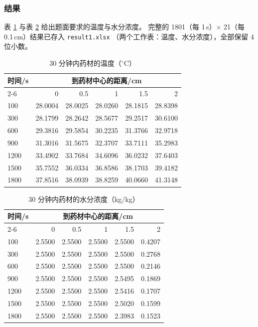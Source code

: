 \documentclass[withoutpreface,bwprint]{cumcmthesis}
\begin{document}
\subsubsection{结果}
表 \ref{tab:p1T} 与表 \ref{tab:p1C} 给出题面要求的温度与水分浓度。
完整的 1801（每 1\,s）$\times$ 21（每 0.1\,cm）结果已存入 \texttt{result1.xlsx}
（两个工作表：温度、水分浓度），全部保留 4 位小数。

\begin{table}[htbp]
  \centering
  \caption{30 分钟内药材的温度（$^\circ$C）}
  \label{tab:p1T}
  \small
  \begin{tabular}{@{}lrrrrr@{}}
    \toprule
    时间/s & \multicolumn{5}{c}{到药材中心的距离/cm} \\
    \cmidrule(lr){2-6}
     & 0 & 0.5 & 1 & 1.5 & 2 \\
    \midrule
    100  & 28.0004 & 28.0025 & 28.0260 & 28.1815 & 28.8398 \\
    300  & 28.1799 & 28.2642 & 28.5677 & 29.2517 & 30.6100 \\
    600  & 29.3816 & 29.5854 & 30.2235 & 31.3766 & 32.9718 \\
    900  & 31.3016 & 31.5675 & 32.3707 & 33.7111 & 35.2983 \\
    1200 & 33.4902 & 33.7684 & 34.6096 & 36.0232 & 37.6403 \\
    1500 & 35.7552 & 36.0334 & 36.8586 & 38.1703 & 39.4182 \\
    1800 & 37.8516 & 38.0939 & 38.8259 & 40.0660 & 41.3148 \\
    \bottomrule
  \end{tabular}
\end{table}

\begin{table}[htbp]
  \centering
  \caption{30 分钟内药材的水分浓度（kg/kg）}
  \label{tab:p1C}
  \small
  \begin{tabular}{@{}lrrrrr@{}}
    \toprule
    时间/s & \multicolumn{5}{c}{到药材中心的距离/cm} \\
    \cmidrule(lr){2-6}
     & 0 & 0.5 & 1 & 1.5 & 2 \\
    \midrule
    100  & 2.5500 & 2.5500 & 2.5500 & 2.5500 & 0.4207 \\
    300  & 2.5500 & 2.5500 & 2.5500 & 2.5500 & 0.2768 \\
    600  & 2.5500 & 2.5500 & 2.5500 & 2.5500 & 0.2146 \\
    900  & 2.5500 & 2.5500 & 2.5500 & 2.5495 & 0.1869 \\
    1200 & 2.5500 & 2.5500 & 2.5500 & 2.5416 & 0.1707 \\
    1500 & 2.5500 & 2.5500 & 2.5500 & 2.5020 & 0.1599 \\
    1800 & 2.5500 & 2.5500 & 2.5500 & 2.3983 & 0.1523 \\
    \bottomrule
  \end{tabular}
\end{table}
\end{document}
